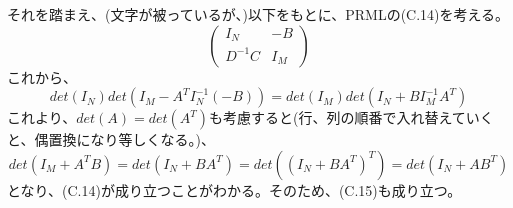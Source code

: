 ﻿\documentclass{jsarticle}
\begin{document}
それを踏まえ、(文字が被っているが、)以下をもとに、PRMLの(C.14)を考える。
\begin{equation}
\begin{pmatrix}
I_N & -B\\
D^{-1}C & I_M
\end{pmatrix}
\end{equation}
これから、
\begin{equation}
det(I_N)det(I_M-A^T I_N^{-1}(-B)) = det(I_M)det(I_N + B I_M^{-1} A^T)
\end{equation}
これより、$det(A) = det(A^T)$も考慮すると(行、列の順番で入れ替えていくと、偶置換になり等しくなる。)、
\begin{equation}
det(I_M + A^T B) = det(I_N + B A^T) = det((I_N + B A^T)^T) = det(I_N + A B^T)
\end{equation}
となり、(C.14)が成り立つことがわかる。そのため、(C.15)も成り立つ。
\end{document}
